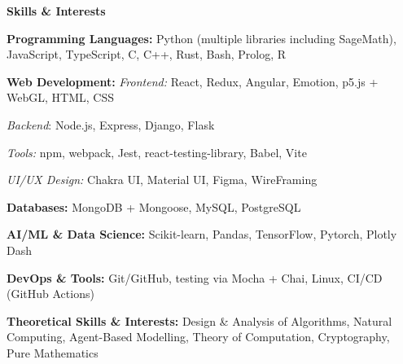 \documentclass[12pt, a4paper]{article}
\begin{document}
\begin{center}
	\large\textbf{Skills \& Interests}
\end{center}

\textbf{Programming Languages:} Python (multiple libraries including SageMath), JavaScript, TypeScript, C, C++, Rust, Bash, Prolog, R

\textbf{Web Development:} \textit{Frontend:} React, Redux, Angular, Emotion, p5.js + WebGL, HTML, CSS

\textit{Backend}: Node.js, Express, Django, Flask

\textit{Tools:} npm, webpack, Jest, react-testing-library, Babel, Vite

\textit{UI/UX Design:} Chakra UI, Material UI, Figma, WireFraming

\textbf{Databases:} MongoDB + Mongoose, MySQL, PostgreSQL

\textbf{AI/ML \& Data Science:} Scikit-learn, Pandas, TensorFlow, Pytorch, Plotly Dash

\textbf{DevOps \& Tools:} Git/GitHub, testing via Mocha + Chai, Linux, CI/CD (GitHub Actions)

\textbf{Theoretical Skills \& Interests:} Design \& Analysis of Algorithms, Natural Computing, Agent-Based Modelling, Theory of Computation, Cryptography, Pure Mathematics
\end{document}
